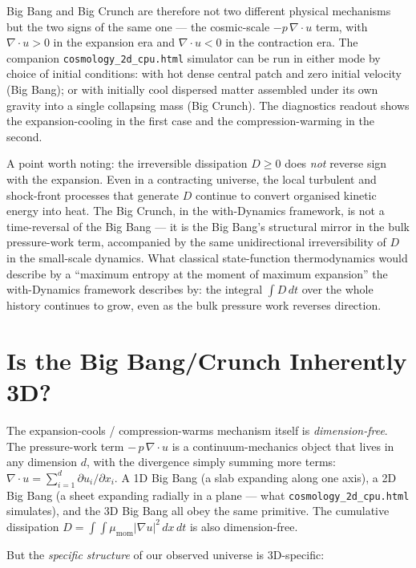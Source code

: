 Big Bang and Big Crunch are therefore not two different physical
mechanisms but the two signs of the same one --- the cosmic-scale
$-p\,\nabla\!\cdot u$ term, with $\nabla\!\cdot u > 0$ in the
expansion era and $\nabla\!\cdot u < 0$ in the contraction era. The
companion \texttt{cosmology\_2d\_cpu.html} simulator can be run in
either mode by choice of initial conditions: with hot dense central
patch and zero initial velocity (Big Bang); or with initially cool
dispersed matter assembled under its own gravity into a single
collapsing mass (Big Crunch). The diagnostics readout shows the
expansion-cooling in the first case and the compression-warming in
the second.

A point worth noting: the irreversible dissipation $D \geq 0$ does
\emph{not} reverse sign with the expansion. Even in a contracting
universe, the local turbulent and shock-front processes that
generate $D$ continue to convert organised kinetic energy into heat.
The Big Crunch, in the with-Dynamics framework, is not a
time-reversal of the Big Bang --- it is the Big Bang's structural
mirror in the bulk pressure-work term, accompanied by the same
unidirectional irreversibility of $D$ in the small-scale dynamics.
What classical state-function thermodynamics would describe by a
``maximum entropy at the moment of maximum expansion'' the
with-Dynamics framework describes by: the integral $\int D\,dt$ over
the whole history continues to grow, even as the bulk pressure work
reverses direction.

\section{Is the Big Bang/Crunch Inherently 3D?}

The expansion-cools / compression-warms mechanism itself is
\emph{dimension-free}. The pressure-work term
$-\,p\,\nabla\!\cdot u$ is a continuum-mechanics object that lives
in any dimension $d$, with the divergence simply summing more terms:
$\nabla\!\cdot u = \sum_{i=1}^d \partial u_i/\partial x_i$. A 1D Big
Bang (a slab expanding along one axis), a 2D Big Bang (a sheet
expanding radially in a plane --- what
\texttt{cosmology\_2d\_cpu.html} simulates), and the 3D Big Bang all
obey the same primitive. The cumulative dissipation
$D = \int\!\int \mu_{\mathrm{mom}}|\nabla u|^2\,dx\,dt$ is also
dimension-free.

But the \emph{specific structure} of our observed universe is
3D-specific:

